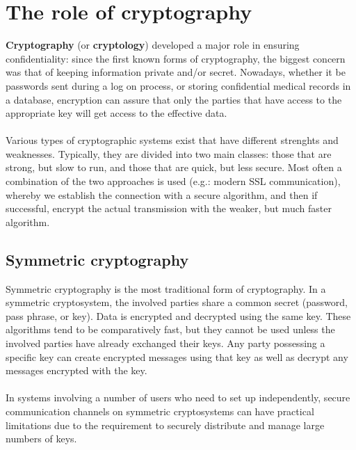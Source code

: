 \documentclass[Lau,binding=0.6cm,oneside]{sapthesis}
\begin{document}
\section{The role of cryptography}
\textbf{Cryptography} (or \textbf{cryptology}) developed a major role in ensuring confidentiality: since the first known forms of cryptography, the biggest concern was that of keeping information private and/or secret. Nowadays, whether it be passwords sent during a log on process, or storing confidential medical records in a database, encryption can assure that only the parties that have access to the appropriate key will get access to the effective data.\\\\
Various types of cryptographic systems exist that have different strenghts and weaknesses. Typically, they are divided into two main classes: those that are strong, but slow to run, and those that are quick, but less secure. Most often a combination of the two approaches is used (e.g.: modern SSL communication), whereby we establish the connection with a secure algorithm, and then if successful, encrypt the actual transmission with the weaker, but much faster algorithm.

\subsection{Symmetric cryptography}
Symmetric cryptography is the most traditional form of cryptography. In a symmetric cryptosystem, the involved parties share a common secret (password, pass phrase, or key). Data is encrypted and decrypted using the same key\supercite{symmetric}. These algorithms tend to be comparatively fast, but they cannot be used unless the involved parties have already exchanged their keys. Any party possessing a specific key can create encrypted messages using that key as well as decrypt any messages encrypted with the key.\\\\
In systems involving a number of users who need to set up independently, secure communication channels on symmetric cryptosystems can have practical limitations due to the requirement to securely distribute and manage large numbers of keys.
\end{document}
